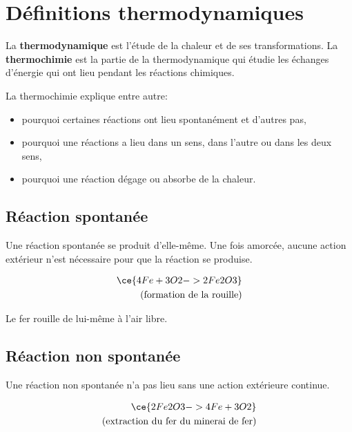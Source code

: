 \documentclass[
  11pt,
  a4paper,
  openany]{book}
\providecommand{\tightlist}{%
  \setlength{\itemsep}{0pt}\setlength{\parskip}{0pt}}
\begin{document}
\newpage

\hypertarget{duxe9finitions-thermodynamiques}{%
\section{Définitions thermodynamiques}\label{duxe9finitions-thermodynamiques}}

La \textbf{thermodynamique} est l'étude de la chaleur et de ses transformations. La \textbf{thermochimie} est la partie de la thermodynamique qui étudie les échanges d'énergie qui ont lieu pendant les réactions chimiques.

La thermochimie explique entre autre:

\begin{itemize}
\tightlist
\item
  pourquoi certaines réactions ont lieu spontanément et d'autres pas,
\item
  pourquoi une réactions a lieu dans un sens, dans l'autre ou dans les deux sens,
\item
  pourquoi une réaction dégage ou absorbe de la chaleur.
\end{itemize}

\hypertarget{ruxe9action-spontanuxe9e}{%
\subsection{Réaction spontanée}\label{ruxe9action-spontanuxe9e}}

Une réaction spontanée se produit d'elle-même. Une fois amorcée, aucune action extérieur n'est nécessaire pour que la réaction se produise.

\[ \begin{split}
  \ce{ 4 Fe + 3O2 -> 2Fe2O3 } \\
  \text{(formation de la rouille)}
  \end{split} \]

Le fer rouille de lui-même à l'air libre.

\hypertarget{ruxe9action-non-spontanuxe9e}{%
\subsection{Réaction non spontanée}\label{ruxe9action-non-spontanuxe9e}}

Une réaction non spontanée n'a pas lieu sans une action extérieure continue.

\[ \begin{split}
  \ce{ 2Fe2O3 -> 4 Fe + 3O2 } \\
  \text{(extraction du fer du minerai de fer)}
  \end{split} \]
\end{document}
